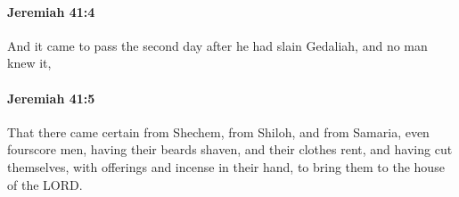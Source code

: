 		\paragraph{Jeremiah 41:4} %
			\label{JEREMIAH-41-4}

			And it came to pass the second day after he had slain Gedaliah, and no man knew it,


		\paragraph{Jeremiah 41:5} %
			\label{JEREMIAH-41-5}

			That there came certain from Shechem, from Shiloh, and from Samaria, even fourscore men, having their beards shaven, and their clothes rent, and having cut themselves, with offerings and incense in their hand, to bring them to the house of the LORD.


